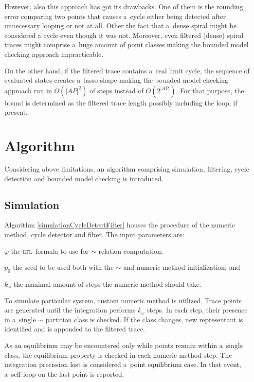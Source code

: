 \documentclass[12pt,oneside,draft]{fithesis}
\newcommand{\ltl}{\textsc{ltl}~}
\begin{document}
However, also this approach has got its drawbacks. One of them
is the rounding error comparing two points that causes a~cycle either
being detected after unnecessary looping or not at all. Other the fact
that a~dense spiral might be considered a cycle even though it was not.
Moreover, even filtered (dense) spiral traces might comprise a~huge
amount of point classes making the bounded model checking approach
impracticable.

On the other hand, if the filtered trace contains a~real limit cycle,
the sequence of evaluated states creates a~lasso-shape making the
bounded model checking approach run in $O(|AP|^2)$ of steps
instead of $O(2^{|AP|})$\cite{biere}. For that purpose, the bound is
determined as the filtered trace length possibly including the loop, if
present.

\section{Algorithm}
Considering above limitations, an algorithm comprising simulation,
filtering, cycle detection and bounded model checking is introduced.
\subsection*{Simulation}
Algorithm \ref{simulationCycleDetectFilter} houses the procedure of
the numeric method, cycle detector and filter. The input parameters are:
\begin{inparaenum}
	\item{$\varphi$} the \ltl formula to use for $\sim$ relation
		computation;
	\item{$p_0$} the seed to be used both with the $\sim$ and numeric
		method initialization; and
	\item{$k_{\omega}$} the maximal amount of steps the numeric method
		should take.
\end{inparaenum}

To simulate particular system, custom numeric method is utilized.
Trace points are generated until the integration performs $k_{\omega}$
steps. In each step, their presence in a~single $\sim$ partition class
is checked. If the class changes, new representant is identified
and is appended to the filtered trace.

As an equilibrium may be encountered only while points remain within
a~single class, the equilibrium property is checked in each numeric
method step. The integration precission lost is considered a~point
equilibrium case. In that event, a~self-loop on the last point is
reported.
\end{document}
